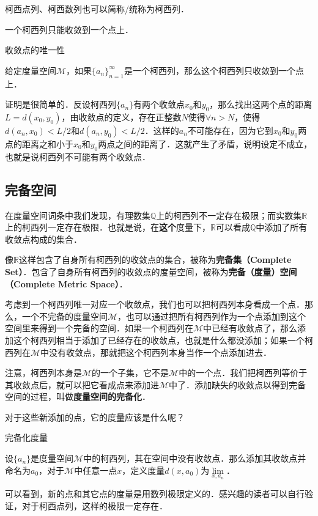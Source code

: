 柯西点列、柯西数列也可以简称/统称为柯西列．

一个柯西列只能收敛到一个点上．

\begin{theorem}{收敛点的唯一性}

给定度量空间$\mathcal{M}$，如果$\{a_n\}_{n=1}^{\infty}$是一个柯西列，那么这个柯西列只收敛到一个点上．

\end{theorem}

证明是很简单的．反设柯西列$\{a_n\}$有两个收敛点$x_0$和$y_0$，那么找出这两个点的距离$L=d(x_0, y_0)$，由收敛点的定义，存在正整数$N$使得$\forall n>N$，使得$d(a_n, x_0)<L/2$和$d(a_n, y_0)<L/2$．这样的$a_n$不可能存在，因为它到$x_0$和$y_0$两点的距离之和小于$x_0$和$y_0$两点之间的距离了．这就产生了矛盾，说明设定不成立，也就是说柯西列不可能有两个收敛点．


\subsection{完备空间}

在度量空间词条中我们发现，有理数集$\mathbb{Q}$上的柯西列不一定存在极限；而实数集$\mathbb{R}$上的柯西列一定存在极限．也就是说，在\textbf{这个}度量下，$\mathbb{R}$可以看成$\mathbb{Q}$中添加了所有收敛点构成的集合．

像$\mathbb{R}$这样包含了自身所有柯西列的收敛点的集合，被称为\textbf{完备集（Complete Set）}．包含了自身所有柯西列的收敛点的度量空间，被称为\textbf{完备（度量）空间（Complete Metric Space）}．

考虑到一个柯西列唯一对应一个收敛点，我们也可以把柯西列本身看成一个点．那么，一个不完备的度量空间$\mathcal{M}$，也可以通过把所有柯西列作为一个点添加到这个空间里来得到一个完备的空间．如果一个柯西列在$\mathcal{M}$中已经有收敛点了，那么添加这个柯西列相当于添加了已经存在的收敛点，也就是什么都没添加；如果一个柯西列在$\mathcal{M}$中没有收敛点，那就把这个柯西列本身当作一个点添加进去．

注意，柯西列本身是$\mathcal{M}$的一个子集，它不是$\mathcal{M}$中的一个点．我们把柯西列等价于其收敛点后，就可以把它看成点来添加进$\mathcal{M}$中了．添加缺失的收敛点以得到完备空间的过程，叫做\textbf{度量空间的完备化}．

对于这些新添加的点，它的度量应该是什么呢？

\begin{definition}{完备化度量}

设$\{a_n\}$是度量空间$\mathcal{M}$中的柯西列，其在空间中没有收敛点．那么添加其收敛点并命名为$a_0$，对于$\mathcal{M}$中任意一点$x$，定义度量$d(x, a_0)$为$\lim\limits_{x, a_n}$．

\end{definition}

可以看到，新的点和其它点的度量是用数列极限定义的．感兴趣的读者可以自行验证，对于柯西点列，这样的极限一定存在．